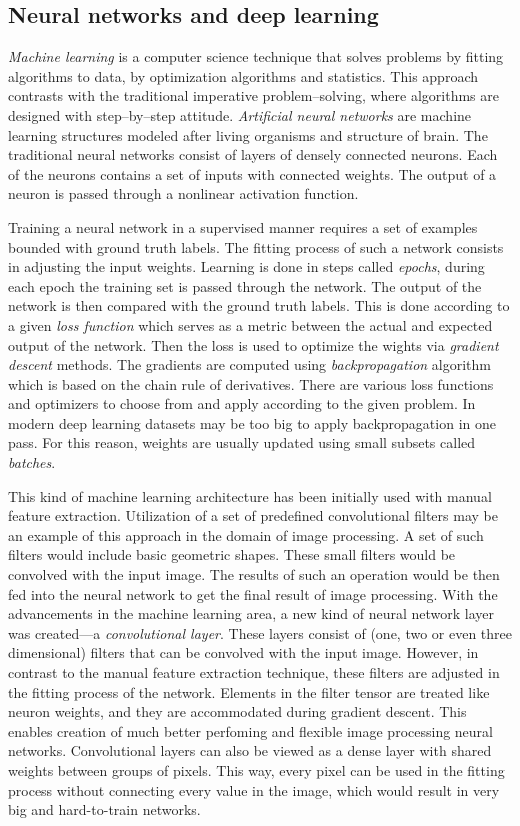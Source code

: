 \subsection{Neural networks and deep learning}
\textit{Machine learning} is a computer science technique that solves problems by fitting algorithms to data, by optimization algorithms and statistics.
This approach contrasts with the traditional imperative problem--solving, where algorithms are designed with step--by--step attitude.
\textit{Artificial neural networks} are machine learning structures modeled after living organisms and structure of brain.
The traditional neural networks consist of layers of densely connected neurons.
Each of the neurons contains a set of inputs with connected weights.
The output of a neuron is passed through a nonlinear activation function.

Training a neural network in a supervised manner requires a set of examples bounded with ground truth labels.
The fitting process of such a network consists in adjusting the input weights.
Learning is done in steps called \textit{epochs}, during each epoch the training set is passed through the network.
The output of the network is then compared with the ground truth labels.
This is done according to a given \textit{loss function} which serves as a metric between the actual and expected output of the network.
Then the loss is used to optimize the wights via \textit{gradient descent} methods.
The gradients are computed using \textit{backpropagation} algorithm which is based on the chain rule of derivatives.
There are various loss functions and optimizers to choose from and apply according to the given problem.
In modern deep learning datasets may be too big to apply backpropagation in one pass.
For this reason, weights are usually updated using small subsets called \textit{batches}.

This kind of machine learning architecture has been initially used with manual feature extraction.
Utilization of a set of predefined convolutional filters may be an example of this approach in the domain of image processing.
A set of such filters would include basic geometric shapes.
These small filters would be convolved with the input image.
The results of such an operation would be then fed into the neural network to get the final result of image processing.
With the advancements in the machine learning area, a new kind of neural network layer was created---a \textit{convolutional layer}.
These layers consist of (one, two or even three dimensional) filters that can be convolved with the input image.
However, in  contrast to the manual feature extraction technique, these filters are adjusted in the fitting process of the network.
Elements in the filter tensor are treated like neuron weights, and they are accommodated during gradient descent.
This enables creation of much better perfoming and flexible image processing neural networks.
Convolutional layers can also be viewed as a dense layer with shared weights between groups of pixels.
This way, every pixel can be used in the fitting process without connecting every value in the image, which would result in very big and hard-to-train networks.

